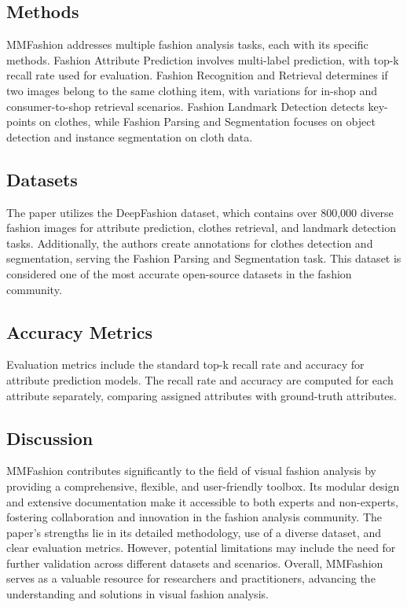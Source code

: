 \documentclass{article}
\begin{document}
\subsection*{Methods}
MMFashion addresses multiple fashion analysis tasks, each with its specific methods. Fashion Attribute Prediction involves multi-label prediction, with top-k recall rate used for evaluation. Fashion Recognition and Retrieval determines if two images belong to the same clothing item, with variations for in-shop and consumer-to-shop retrieval scenarios. Fashion Landmark Detection detects key-points on clothes, while Fashion Parsing and Segmentation focuses on object detection and instance segmentation on cloth data.

\subsection*{Datasets}
The paper utilizes the DeepFashion dataset, which contains over 800,000 diverse fashion images for attribute prediction, clothes retrieval, and landmark detection tasks. Additionally, the authors create annotations for clothes detection and segmentation, serving the Fashion Parsing and Segmentation task. This dataset is considered one of the most accurate open-source datasets in the fashion community.

\subsection*{Accuracy Metrics}
Evaluation metrics include the standard top-k recall rate and accuracy for attribute prediction models. The recall rate and accuracy are computed for each attribute separately, comparing assigned attributes with ground-truth attributes.

\subsection*{Discussion}
MMFashion contributes significantly to the field of visual fashion analysis by providing a comprehensive, flexible, and user-friendly toolbox. Its modular design and extensive documentation make it accessible to both experts and non-experts, fostering collaboration and innovation in the fashion analysis community. The paper's strengths lie in its detailed methodology, use of a diverse dataset, and clear evaluation metrics. However, potential limitations may include the need for further validation across different datasets and scenarios. Overall, MMFashion serves as a valuable resource for researchers and practitioners, advancing the understanding and solutions in visual fashion analysis.
\end{document}
